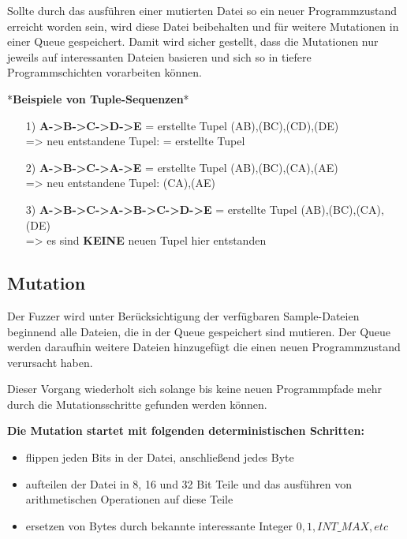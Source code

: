 \documentclass[12pt,a4paper]{scrreprt}
\begin{document}
Sollte durch das ausführen einer mutierten Datei so ein neuer Programmzustand erreicht worden sein, wird diese Datei beibehalten und für weitere Mutationen in einer Queue gespeichert. Damit wird sicher gestellt, dass die Mutationen nur jeweils auf interessanten Dateien basieren und sich so in tiefere Programmschichten vorarbeiten können.

\newpage

*\textbf{Beispiele von Tuple-Sequenzen}*

\begin{itemize}

\item[1)] \textbf{A->B->C->D->E}	= erstellte Tupel (AB),(BC),(CD),(DE) \\ => neu entstandene Tupel: = erstellte Tupel

\item[2)] \textbf{A->B->C->A->E} = erstellte Tupel (AB),(BC),(CA),(AE) \\ => neu entstandene Tupel:  (CA),(AE)

\item[3)] \textbf{A->B->C->A->B->C->D->E} = erstellte Tupel (AB),(BC),(CA),(DE) \\ => es sind \textbf{KEINE} neuen Tupel hier entstanden

\end{itemize}

\vspace{1cm}

\subsection{Mutation}

Der Fuzzer wird unter Berücksichtigung der verfügbaren Sample-Dateien beginnend alle Dateien, die in der Queue gespeichert sind mutieren. Der Queue werden daraufhin weitere Dateien hinzugefügt die einen neuen Programmzustand verursacht haben. 

Dieser  Vorgang wiederholt sich solange bis keine neuen Programmpfade mehr durch die Mutationsschritte gefunden werden können.

\vspace{1cm}

\textbf{Die Mutation startet mit folgenden deterministischen Schritten:}

\begin{itemize}

\item flippen jeden Bits in der Datei, anschließend jedes Byte

\item aufteilen der Datei in 8, 16 und 32 Bit Teile und das ausführen von arithmetischen Operationen auf diese Teile

\item ersetzen von Bytes durch bekannte interessante Integer \(0, 1, INT\_MAX, etc\)    

\end{itemize}
\end{document}
